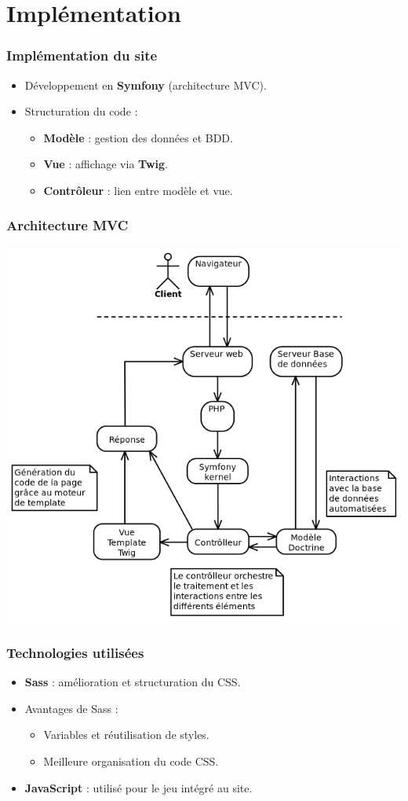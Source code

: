 \section{Implémentation}

\begin{frame}
    \frametitle{Implémentation du site}

    \begin{itemize}
        \item Développement en \textbf{Symfony} (architecture MVC).
        \item Structuration du code :
              \begin{itemize}
                \item \textbf{Modèle} : gestion des données et BDD.
                \item \textbf{Vue} : affichage via \textbf{Twig}.
                \item \textbf{Contrôleur} : lien entre modèle et vue.
              \end{itemize}
    \end{itemize}
\end{frame}

\begin{frame}
    \frametitle{Architecture MVC}

    \centering
    \includegraphics[width=0.7\linewidth]{pictures/mvc.png}
\end{frame}

\begin{frame}
    \frametitle{Technologies utilisées}

    \begin{itemize}
        \item \textbf{Sass} : amélioration et structuration du CSS.
        \item Avantages de Sass :
              \begin{itemize}
                \item Variables et réutilisation de styles.
                \item Meilleure organisation du code CSS.
              \end{itemize}
        \item \textbf{JavaScript} : utilisé pour le jeu intégré au site.
    \end{itemize}
\end{frame}
